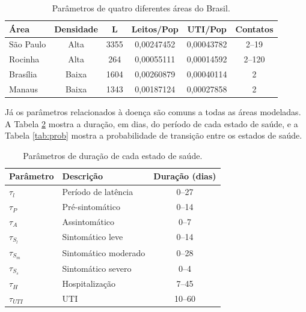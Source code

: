 \begin{table}[H]
\centering
\caption{Parâmetros de quatro diferentes áreas do Brasil.}
\label{tab:area}
\begin{tabular}{l c c c c c}
\hline
\textbf{Área} & \textbf{Densidade} & \textbf{L} & \textbf{Leitos/Pop} & \textbf{UTI/Pop} & \textbf{Contatos} \\
\hline
São Paulo & Alta  & 3355 & 0,00247452 & 0,00043782 & 2--19 \\
Rocinha   & Alta  & 264  & 0,00055111 & 0,00014592 & 2--120 \\
Brasília  & Baixa & 1604 & 0,00260879 & 0,00040114 & 2 \\
Manaus    & Baixa & 1343 & 0,00187124 & 0,00027858 & 2 \\
\hline
\end{tabular}
\end{table}

Já os parâmetros relacionados à doença são comuns a todas as áreas modeladas. A Tabela \ref{tab:dias} mostra a duração, em dias, do período de cada estado de saúde, e a Tabela \ref{tab:prob} mostra a probabilidade de transição entre os estados de saúde.

\begin{table}[H]
\centering
\caption{Parâmetros de duração de cada estado de saúde.}
\label{tab:dias}
\begin{tabular}{l l c}
\hline
\textbf{Parâmetro} & \textbf{Descrição} & \textbf{Duração (dias)} \\
\hline
$\tau_{l}$    & Período de latência   & 0--27 \\
$\tau_{P}$    & Pré-sintomático       & 0--14 \\
$\tau_{A}$    & Assintomático         & 0--7  \\
$\tau_{S_l}$  & Sintomático leve      & 0--14 \\
$\tau_{S_m}$  & Sintomático moderado  & 0--28 \\
$\tau_{S_s}$  & Sintomático severo    & 0--4  \\
$\tau_{H}$    & Hospitalização        & 7--45 \\
$\tau_{UTI}$  & UTI                   & 10--60 \\
\hline
\end{tabular}
\end{table}

